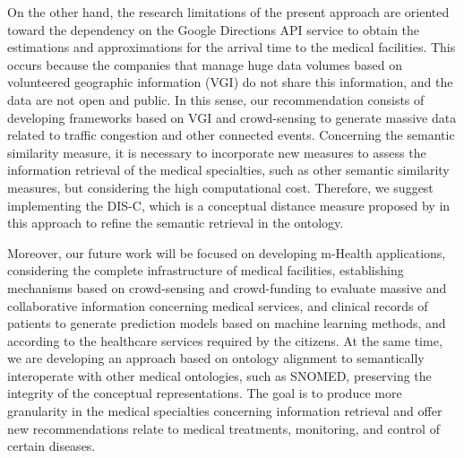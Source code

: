 \documentclass[sustainability,article,submit,pdftex,moreauthors]{Definitions/mdpi}
\begin{document}
{On the other hand, the research limitations of the present approach are oriented toward the dependency on the Google Directions API service to obtain the estimations and approximations for the arrival time to the medical facilities. This occurs because the companies that manage huge data volumes based on volunteered geographic information (VGI) do not share this information, and the data are not open and public. In this sense, our recommendation consists of developing frameworks based on VGI and crowd-sensing to generate massive data related to traffic congestion and other connected events. Concerning the semantic similarity measure, it is necessary to incorporate new measures to assess the information retrieval of the medical specialties, such as other semantic similarity measures, but considering the high computational cost. Therefore, we suggest implementing the DIS-C, which is a conceptual distance measure proposed by \citet{quintero2019dis} in this approach to refine the semantic retrieval in the ontology.}

{Moreover, our future work will be focused on developing m-Health applications, considering the complete infrastructure of medical facilities, establishing mechanisms based on crowd-sensing and crowd-funding to evaluate massive and collaborative information concerning medical services, and clinical records of patients to generate prediction models based on machine learning methods, and according to the healthcare services required by the citizens. At the same time, we are developing an approach based on ontology alignment to semantically interoperate with other medical ontologies, such as SNOMED, preserving the integrity of the conceptual representations. The goal is to produce more granularity in the medical specialties concerning information retrieval and offer new recommendations relate to medical treatments, monitoring, and control of certain diseases.}



\end{document}
